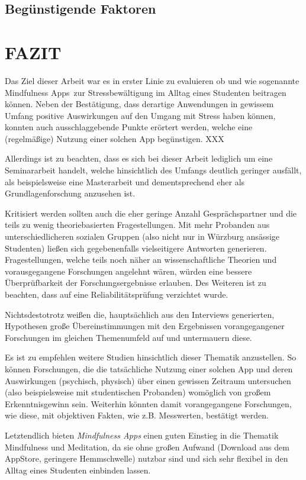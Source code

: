 \documentclass[10pt]{article}
\begin{document}
\subsection{Begünstigende Faktoren}


\section{FAZIT}
Das Ziel dieser Arbeit war  es in erster Linie zu evaluieren ob und wie sogenannte \grqq Mindfulness Apps\grqq\ zur Stressbewältigung im Alltag eines Studenten beitragen können. 
Neben der Bestätigung, dass derartige Anwendungen in gewissem Umfang positive Auswirkungen auf den Umgang mit Stress haben können, konnten auch ausschlaggebende Punkte erörtert werden, welche eine (regelmäßige) Nutzung einer solchen App begünstigen.  XXX


Allerdings ist zu beachten, dass es sich bei dieser Arbeit lediglich um eine Seminararbeit handelt, welche hinsichtlich des Umfangs deutlich geringer ausfällt, als beispielsweise eine Masterarbeit und dementsprechend eher als Grundlagenforschung anzusehen ist. 

Kritisiert werden sollten auch die eher geringe Anzahl Gesprächspartner und die teils zu wenig theoriebasierten  Fragestellungen. Mit mehr Probanden aus unterschiedlicheren sozialen Gruppen (also nicht nur in Würzburg ansässige Studenten) ließen sich gegebenenfalls vielseitigere Antworten generieren. Fragestellungen, welche teils noch näher an wissenschaftliche Theorien und vorausgegangene Forschungen angelehnt wären, würden eine bessere Überprüfbarkeit der Forschungsergebnisse erlauben. Des Weiteren ist zu beachten, dass auf eine Reliabilitätsprüfung verzichtet wurde.

Nichtsdestotrotz weißen die, hauptsächlich aus den Interviews generierten, Hypothesen große Übereinstimmungen mit den Ergebnissen vorangegangener Forschungen im gleichen Themenumfeld auf und untermauern diese.

Es ist zu empfehlen weitere Studien hinsichtlich dieser Thematik anzustellen. So können Forschungen, die die tatsächliche Nutzung einer solchen App und deren Auswirkungen (psychisch, physisch) über einen gewissen Zeitraum untersuchen (also beispielsweise mit studentischen Probanden) womöglich von großem Erkenntnisgewinn sein. Weiterhin könnten damit vorangegangene Forschungen, wie diese, mit objektiven Fakten, wie z.B. Messwerten, bestätigt werden.

Letztendlich bieten \textit{Mindfulness Apps} einen guten Einstieg in die Thematik Mindfulness und Meditation, da sie ohne großen Aufwand (Download aus dem AppStore, geringere Hemmschwelle) nutzbar sind und sich sehr flexibel in den Alltag eines Studenten einbinden lassen.
\nocite{*}
\printbibliography
\end{document}
